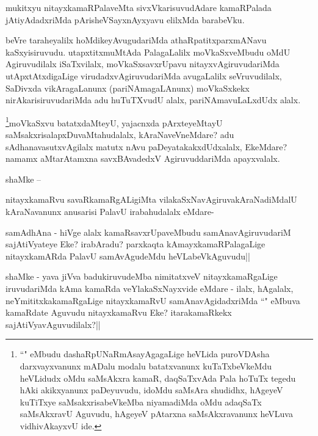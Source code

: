 \begin{artha}
mukitxyu nitayxkamaRPalaveMta sivxVkarisuvudAdare kamaRPalada jAtiyAdadxriMda pArisheVSayxnAyxyavu elilxMda barabeVku.
\end{artha}

\begin{artha}
beVre taraheyalilx hoMdikeyAvugudariMda athaRpatitxparxmANavu kaSxyisiruvudu. utapxtitxmuMtAda PalagaLalilx moVkaSxveMbudu oMdU Agiruvudilalx iSaTxvilalx, moVkaSxsavxrUpavu nitayxvAgiruvudariMda utApxtAtxdigaLige virudadxvAgiruvudariMda avugaLalilx seVruvudilalx, SaDivxda vikAragaLanunx (pariNAmagaLAnunx) moVkaSxkekx nirAkarisiruvudariMda adu huTuTXvudU alalx, pariNAmavuLaLxdUdx alalx.
\end{artha}

\begin{artha}
\footnote{``\stext" eMbudu dashaRpUNaRmAsayAgagaLige heVLida puroVDAsha darxvayxvanunx mADalu modalu batatxvanunx kuTaTxbeVkeMdu heVLidudx oMdu saMsAkxra kamaR, daqSaTxvAda Pala hoTuTx tegedu hAki akikxyanunx paDeyuvudu, idoMdu saMsAra shudidhx, hAgeyeV kuTiTxye saMsakxrisabeVkeMba niyamadiMda oMdu adaqSaTx saMsAkxravU Aguvudu, hAgeyeV pAtarxna saMsAkxravanunx heVLuva vidhivAkayxvU ide.}moVkaSxvu batatxdaMteyU, yajacnxda pArxteyeMtayU saMsakxrisalapxDuvaMtahudalalx, kAraNaveVneMdare? adu sAdhanavasutxvAgilalx matutx nAvu paDeyatakakxdUdxalalx, EkeMdare? namamx aMtarAtamxna savxBAvadedxV AgiruvuddariMda apayxvalalx.
\end{artha}

\begin{artha}
shaMke --
\end{artha}

\begin{artha}
nitayxkamaRvu savaRkamaRgALigiMta vilakaSxNavAgiruvakAraNadiMdalU kAraNavanunx anusarisi PalavU irabahudalalx eMdare-
\end{artha}


\begin{artha}
samAdhAna - hiVge alalx kamaRsavxrUpaveMbudu samAnavAgiruvudariM sajAtiVyateye Eke? irabAradu? parxkaqta kAmayxkamaRPalagaLige nitayxkamARda PalavU samAvAgudeMdu heVLabeVkAguvudu||
\end{artha}

\begin{artha}
shaMke - yava jiVva badukiruvudeMba nimitatxveV nitayxkamaRgaLige iruvudariMda kAma kamaRda veYlakaSxNayxvide eMdare - ilalx, hAgalalx, neYmititxkakamaRgaLige nitayxkamaRvU samAnavAgidadxriMda ``\stext" eMbuva kamaRdate Aguvudu nitayxkamaRvu Eke? itarakamaRkekx sajAtiVyavAguvudilalx?|| 
\end{artha}

